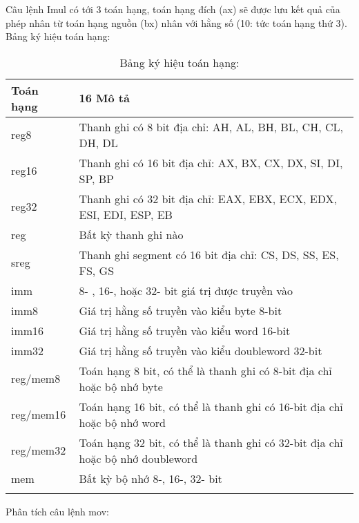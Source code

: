 	Câu lệnh Imul có tới 3 toán hạng, toán hạng đích (ax) sẽ được lưu kết quả của phép nhân từ toán hạng nguồn (bx) nhân với hằng số (10: tức toán hạng thứ 3).\\
	Bảng ký hiệu toán hạng:
	\begin{longtable}{ | m{3cm} | m{12cm} | }
			\hline
				Toán hạng & 16 Mô tả\\
			\hline
			\hline
				reg8 & Thanh ghi có 8 bit địa chỉ: AH, AL, BH, BL, CH, CL, DH, DL \\
			\hline			
				reg16& Thanh ghi có 16 bit địa chỉ: AX, BX, CX, DX, SI, DI, SP, BP\\
			\hline		
				reg32& Thanh ghi có 32 bit địa chỉ: EAX, EBX, ECX, EDX, ESI, EDI, ESP, EB\\
			\hline	
				reg&	Bất kỳ thanh ghi nào\\
			\hline	
				sreg & Thanh ghi segment có 16 bit địa chỉ: CS, DS, SS, ES, FS, GS\\
			\hline	
				imm	&8- , 16-, hoặc 32- bit giá trị được truyền vào\\
			\hline	
				imm8	& Giá trị hằng số truyền vào kiểu byte 8-bit\\
			\hline	
				imm16	& Giá trị hằng số truyền vào kiểu word 16-bit\\
			\hline	
				imm32&	Giá trị hằng số truyền vào kiểu doubleword 32-bit\\
			\hline	
				reg/mem8& Toán hạng 8 bit, có thể là thanh ghi có 8-bit địa chỉ hoặc bộ nhớ byte\\
			\hline	
				reg/mem16&	Toán hạng 16 bit, có thể là thanh ghi có 16-bit địa chỉ hoặc bộ nhớ word\\
			\hline	
				reg/mem32	& Toán hạng 32 bit, có thể là thanh ghi có 32-bit địa chỉ hoặc bộ nhớ doubleword\\
			\hline	
				mem	& Bất kỳ bộ nhớ 8-, 16-, 32- bit\\
		\hline	
			\caption{Bảng ký hiệu toán hạng:}
			\label{table:tbkyhieu}
	\end{longtable}
	
		Phân tích câu lệnh mov: \\
		
